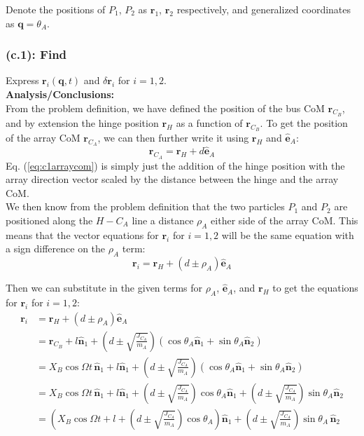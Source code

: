 \documentclass[titlepage]{article}
\begin{document}
Denote the positions of $P_1$, $P_2$ as $\boldsymbol{r}_1$, $\boldsymbol{r}_2$ respectively, and generalized coordinates as $\boldsymbol{q}=\theta_A$.

\subsubsection*{(c.1): Find}
Express $\boldsymbol{r}_i(\boldsymbol{q},t)$ and $\delta\boldsymbol{r}_i$ for $i=1,2$.\\

\textbf{Analysis/Conclusions:}\\
From the problem definition, we have defined the position of the bus CoM $\boldsymbol{r}_{C_B}$, and by extension the hinge position $\boldsymbol{r}_H$ as a function of $\boldsymbol{r}_{C_B}$. To get the position of the array CoM $\boldsymbol{r}_{C_A}$, we can then further write it using $\boldsymbol{r}_H$ and $\hat{\boldsymbol{e}}_A$:
\begin{equation}
	\boldsymbol{r}_{C_A}=\boldsymbol{r}_H+d\hat{\boldsymbol{e}}_A
	\label{eq:c1arraycom}
\end{equation}
Eq. (\ref{eq:c1arraycom}) is simply just the addition of the hinge position with the array direction vector scaled by the distance between the hinge and the array CoM.\\

We then know from the problem definition that the two particles $P_1$ and $P_2$ are positioned along the $H-C_A$ line a distance $\rho_A$ either side of the array CoM. This means that the vector equations for $\boldsymbol{r}_i$ for $i=1,2$ will be the same equation with a sign difference on the $\rho_A$ term:
\begin{equation}
	\boldsymbol{r}_i=\boldsymbol{r}_H+(d\pm\rho_A)\hat{\boldsymbol{e}}_A
\end{equation}

Then we can substitute in the given terms for $\rho_A$, $\hat{\boldsymbol{e}}_A$, and $\boldsymbol{r}_H$ to get the equations for $\boldsymbol{r}_i$ for $i=1,2$:
\begin{equation}
	\begin{split}
		\boldsymbol{r}_i&=\boldsymbol{r}_H+(d\pm\rho_A)\hat{\boldsymbol{e}}_A \\
		&=\boldsymbol{r}_{C_B}+l\hat{\boldsymbol{n}}_1+\left(d\pm\sqrt{\frac{J_{C_A}}{m_A}}\right)\left(\cos\theta_A\hat{\boldsymbol{n}}_1+\sin\theta_A\hat{\boldsymbol{n}}_2\right) \\
		&=X_B\cos\Omega t\,\hat{\boldsymbol{n}}_1+l\hat{\boldsymbol{n}}_1+\left(d\pm\sqrt{\frac{J_{C_A}}{m_A}}\right)\left(\cos\theta_A\hat{\boldsymbol{n}}_1+\sin\theta_A\hat{\boldsymbol{n}}_2\right) \\
				&=X_B\cos\Omega t\,\hat{\boldsymbol{n}}_1+l\hat{\boldsymbol{n}}_1+\left(d\pm\sqrt{\frac{J_{C_A}}{m_A}}\right)\cos\theta_A\hat{\boldsymbol{n}}_1+\left(d\pm\sqrt{\frac{J_{C_A}}{m_A}}\right)\sin\theta_A\hat{\boldsymbol{n}}_2 \\
		&=\left(X_B\cos\Omega t+l+\left(d\pm\sqrt{\frac{J_{C_A}}{m_A}}\right)\cos\theta_A\right)\hat{\boldsymbol{n}}_1+\left(d\pm\sqrt{\frac{J_{C_A}}{m_A}}\right)\sin\theta_A\,\hat{\boldsymbol{n}}_2
	\end{split}
\end{equation}
\end{document}
